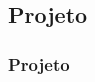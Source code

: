 \subsection[Projeto]{Projeto}\label{subsec:sec99-projeto-2-projeto}



\begin{frame}[t]\frametitle{Projeto}


\end{frame}
